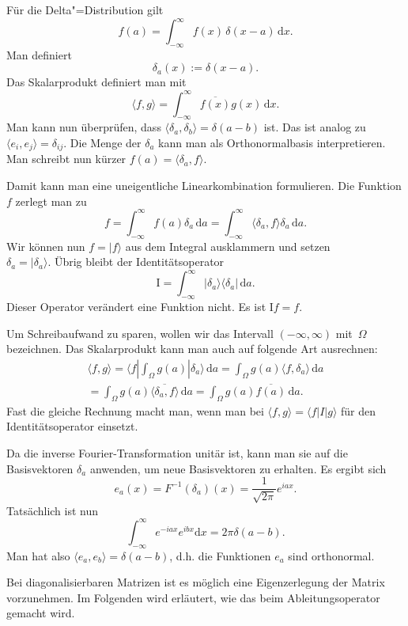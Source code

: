 \documentclass[a4paper,10pt,fleqn,twocolumn,twoside]{article}
\begin{document}
Für die Delta"=Distribution gilt
\[f(a) = \int_{-\infty}^{\infty} f(x)\,\delta(x-a)\,\mathrm dx.\]
Man definiert
\[\delta_a(x) := \delta(x-a).\]
Das Skalarprodukt definiert man mit
\[\langle f,g\rangle
= \int_{-\infty}^{\infty} \overline{f(x)}g(x)\,\mathrm dx.\]
Man kann nun überprüfen, dass
\(\langle\delta_a,\delta_b\rangle=\delta(a-b)\) ist. Das ist analog
zu \(\langle e_i,e_j\rangle = \delta_{ij}\). Die Menge der
\(\delta_a\) kann man als Orthonormalbasis interpretieren.
Man schreibt nun kürzer \(f(a) = \langle\delta_a,f\rangle\).

Damit kann man eine uneigentliche Linearkombination formulieren.
Die Funktion \(f\) zerlegt man zu
\[f = \int_{-\infty}^{\infty} f(a)\delta_a\,\mathrm da
= \int_{-\infty}^{\infty} \langle\delta_a,f\rangle\delta_a\,\mathrm da.\]
Wir können nun \(f=|f\rangle\) aus dem Integral ausklammern und setzen\\
\(\delta_a = |\delta_a\rangle\).
Übrig bleibt der Identitätsoperator
\[\mathrm I
= \int_{-\infty}^{\infty} |\delta_a\rangle\langle\delta_a|\,\mathrm da.\]
Dieser Operator verändert eine Funktion nicht. Es ist \(\mathrm If=f\).

Um Schreibaufwand zu sparen, wollen wir das Intervall
\((-\infty,\infty)\) mit~\(\Omega\) bezeichnen. Das Skalarprodukt
kann man auch auf folgende Art ausrechnen:
\begin{gather*}
\langle f,g\rangle = \langle f|\int_{\Omega} g(a)|\delta_a\rangle\,\mathrm da
= \int_{\Omega} g(a)\langle f,\delta_a\rangle\,\mathrm da\\
= \int_{\Omega} g(a)\overline{\langle\delta_a,f\rangle}\,\mathrm da
= \int_{\Omega} g(a)\overline{f(a)}\,\mathrm da.
\end{gather*}
Fast die gleiche Rechnung macht man, wenn man bei \(\langle f,g\rangle=\langle f|I|g\rangle\) für den Identitätsoperator einsetzt.

Da die inverse Fourier-Transformation unitär ist, kann man sie auf
die Basisvektoren \(\delta_a\) anwenden, um neue Basisvektoren zu
erhalten. Es ergibt sich
\[e_a(x) = F^{-1}(\delta_a)(x) = \frac{1}{\sqrt{2\pi}}e^{iax}.\]
Tatsächlich ist nun
\[\int_{-\infty}^{\infty} e^{-iax}e^{ibx}\mathrm dx = 2\pi\delta(a-b).\]
Man hat also \(\langle e_a,e_b\rangle = \delta(a-b)\), d.h. die
Funktionen \(e_a\) sind orthonormal.

Bei diagonalisierbaren Matrizen ist es möglich eine Eigenzerlegung
der Matrix vorzunehmen. Im Folgenden wird erläutert, wie das beim
Ableitungsoperator gemacht wird.
\end{document}
